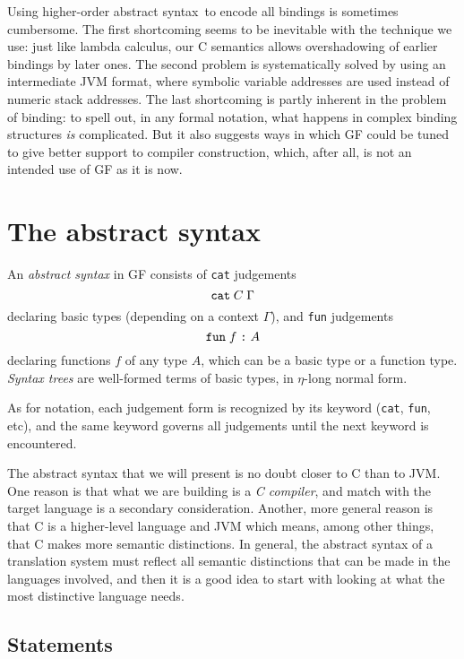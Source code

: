 \documentclass[12pt]{article}
\newcommand{\HOAS}{higher-order abstract syntax}
\newcommand{\empha}[1]{{\em #1}}
\begin{document}
Using \HOAS\ to encode all bindings is sometimes cumbersome.
\enqu
The first shortcoming seems to be inevitable with the technique
we use: just like lambda calculus, our C semantics allows
overshadowing of earlier bindings by later ones. 
The second problem is systematically solved by using
an intermediate JVM format, where symbolic variable addresses
are used instead of numeric stack addresses.
The last shortcoming is partly inherent in the problem of binding:
to spell out, in any formal notation,
what happens in complex binding structures \textit{is}
complicated. But it also suggests ways in which GF could be 
tuned to give better support
to compiler construction, which, after all, is not an intended
use of GF as it is now.








\section{The abstract syntax}

An \empha{abstract syntax} in GF consists of \texttt{cat} judgements
\[
\mbox{\texttt{cat}} \; C \; \Gamma
\]
declaring basic types (depending on a context $\Gamma$), 
and \texttt{fun} judgements 
\[
\mbox{\texttt{fun}} \; f \; \mbox{\texttt{:}} \; A
\]
declaring functions $f$ of any type $A$, which can be a basic type or
a function type.
\empha{Syntax trees} are well-formed terms of basic
types, in $\eta$-long normal form.

As for notation, each judgement form is recognized by
its keyword (\texttt{cat}, \texttt{fun}, etc), 
and the same keyword governs all judgements
until the next keyword is encountered.

The abstract syntax that we will present is no doubt closer
to C than to JVM. One reason is that what we are building is a
\textit{C compiler}, and match with the target language is a
secondary consideration. Another, more general reason is that
C is a higher-level language and JVM which means, among
other things, that C makes more semantic distinctions.
In general, the abstract syntax of a translation system
must reflect all semantic distinctions that can be made
in the languages involved, and then it is a good idea to
start with looking at what the most distinctive language
needs.



\subsection{Statements}
\end{document}

